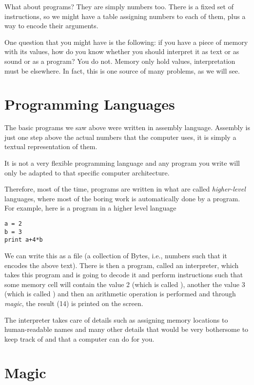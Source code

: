 What about programs? They are simply numbers too. There is a fixed set of
instructions, so we might have a table assigning numbers to each of them, plus
a way to encode their arguments.

One question that you might have is the following: if you have a piece of
memory with its values, how do you know whether you should interpret it as text
or as sound or as a program? You do not. Memory only hold values,
interpretation must be elsewhere. In fact, this is one source of many problems,
as we will see.

\section{Programming Languages}

The basic programs we saw above were written in assembly language. Assembly is
just one step above the actual numbers that the computer uses, it is simply a
textual representation of them.

It is not a very flexible programming language and any program you write will
only be adapted to that specific computer architecture.

Therefore, most of the time, programs are written in what are called
\emph{higher-level} languages, where most of the boring work is automatically
done by a program. For example, here is a program in a higher level language

\begin{verbatim}
a = 2
b = 3
print a+4*b
\end{verbatim}

We can write this as a file (a collection of Bytes, i.e., numbers such that it
encodes the above text). There is then a program, called an interpreter, which
takes this program and is going to decode it and perform instructions such that
some memory cell will contain the value 2 (which is called ), another
the value 3 (which is called ) and then an arithmetic operation is
performed and through \emph{magic}, the result (14) is printed on the screen.

The interpreter takes care of details such as assigning memory locations to
human-readable names and many other details that would be very bothersome to
keep track of and that a computer can do for you.

\section{Magic}

